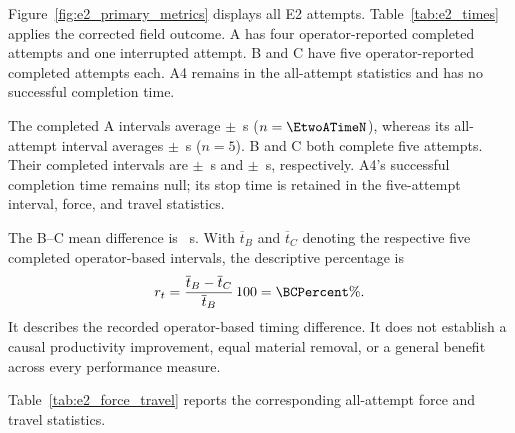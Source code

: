 Figure~\ref{fig:e2_primary_metrics} displays all E2 attempts. Table~\ref{tab:e2_times} applies the corrected field outcome. A has four operator-reported completed attempts and one interrupted attempt. B and C have five operator-reported completed attempts each. A4 remains in the all-attempt statistics and has no successful completion time.

\begin{table}[H]\centering\footnotesize
\caption[E2 corrected completion, timing, and peaks]{E2 results with A4 corrected to incomplete release and operator interruption. Completed-time statistics use A \(n=4\), B/C \(n=5\). Mean observed peak is the mean of the five per-run peaks in every condition, including A4, not the whole-signal mean or pooled maximum. Values are mean \(\pm\) sample SD.}
\label{tab:e2_times}

\end{table}

The completed A intervals average \EtwoATime\(\pm\)\EtwoATimeSD~s (\(n=\EtwoATimeN\)), whereas its all-attempt interval averages \EtwoAInterval\(\pm\)\EtwoAIntervalSD~s (\(n=5\)). B and C both complete five attempts. Their completed intervals are \EtwoBTime\(\pm\)\EtwoBTimeSD~s and \EtwoCTime\(\pm\)\EtwoCTimeSD~s, respectively. A4's successful completion time remains null; its stop time is retained in the five-attempt interval, force, and travel statistics.

The B--C mean difference is \BCSeconds~s. With \(\overline t_B\) and \(\overline t_C\) denoting the respective five completed operator-based intervals, the descriptive percentage is
\begin{equation}
 r_t=\frac{\overline t_B-\overline t_C}{\overline t_B}\,100
     =\BCPercent\%.
 \label{eq:bc_time_difference}
\end{equation}
It describes the recorded operator-based timing difference. It does not establish a causal productivity improvement, equal material removal, or a general benefit across every performance measure.


Table~\ref{tab:e2_force_travel} reports the corresponding all-attempt force and travel statistics.

\begin{table}[tbp]\centering\footnotesize
\caption[E2 all-attempt force and travel]{E2 all-attempt force and motion statistics, \(n=5\) per condition. ``Peak'' is the mean of per-run measured peaks. Whole-window mean force includes approach and exit and is not a contact-only force-quality measure.}
\label{tab:e2_force_travel}

\end{table}

